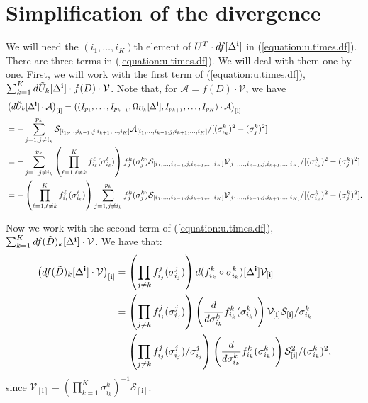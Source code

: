 \section{Simplification of the divergence}
\label{sec:simp.div}
We will need the $(i_1,\ldots,i_K)$th element of $U^T \cdot
df[\Delta^{\bf i}]$ in (\ref{equation:u.times.df}). There are three
terms in (\ref{equation:u.times.df}). We will deal with them one by
one. First, we will work with the first term of
(\ref{equation:u.times.df}), $\sum_{k=1}^Kd\tilde{U}_k[\Delta^{\bf i}]
\cdot f(D) \cdot \mathcal{V}$.  Note that, for $\mathcal{A} =
f(D)\cdot\mathcal{V}$, we have
\begin{align*}
  &\left(d\tilde{U}_k[\Delta^{\bf i}] \cdot \mathcal{A}\right)_{[\mathbf{i}]} = \left((I_{p_1},\ldots,I_{p_{k-1}},\Omega_{U_k}[\Delta^{\bf i}],I_{p_{k+1}},\ldots,I_{p_K})\cdot \mathcal{A}\right)_{[\mathbf{i}]}\\
  &= -\sum_{j=1, j\neq i_k}^{p_k}\mathcal{S}_{[i_1,\ldots,i_{k-1},j,i_{k+1},\ldots,i_K]}\mathcal{A}_{[i_1,\ldots,i_{k-1},j,i_{k+1},\ldots,i_K]}/[(\sigma_{i_k}^k)^2 - (\sigma_j^k)^2]\\
  &= -\sum_{j=1, j\neq i_k}^{p_k}\left(\prod_{\ell=1,\ell \neq k}^Kf_{i_{\ell}}^{\ell}(\sigma_{i_{\ell}}^{\ell})\right)f_j^k(\sigma_j^k)\mathcal{S}_{[i_1,\ldots,i_{k-1},j,i_{k+1},\ldots,i_K]}\mathcal{V}_{[i_1,\ldots,i_{k-1},j,i_{k+1},\ldots,i_K]}/[(\sigma_{i_k}^k)^2 - (\sigma_j^k)^2]\\
  &= -\left(\prod_{\ell=1,\ell \neq k}^Kf_{i_{\ell}}^{\ell}(\sigma_{i_{\ell}}^{\ell})\right)\sum_{j=1, j\neq i_k}^{p_k}f_j^k(\sigma_j^k)\mathcal{S}_{[i_1,\ldots,i_{k-1},j,i_{k+1},\ldots,i_K]}\mathcal{V}_{[i_1,\ldots,i_{k-1},j,i_{k+1},\ldots,i_K]}/[(\sigma_{i_k}^k)^2 - (\sigma_j^k)^2].
\end{align*}

Now we work with the second term of (\ref{equation:u.times.df}),
$\sum_{k=1}^K df(\tilde{D})_k[\Delta^{\bf i}] \cdot \mathcal{V}$.  We
have that:
\begin{align}
  \left(df(\tilde{D})_k[\Delta^{\bf i}] \cdot
    \mathcal{V}\right)_{[\mathbf{i}]} &= \left(\prod_{j\neq
      k}f_{i_j}^j(\sigma_{i_j}^j)\right)d(f_{i_k}^k \circ
  \sigma_{i_k}^k)[\Delta^{\bf i}]\mathcal{V}_{[\mathbf{i}]} \label{equation:simp.diff.first}\\
  &= \left(\prod_{j\neq k}f_{i_j}^j(\sigma_{i_j}^j)\right)\left(\frac{d}{d\sigma_{i_k}^k}f_{i_k}^k(\sigma_{i_k}^k)\right)\mathcal{V}_{[\mathbf{i}]}\mathcal{S}_{[\mathbf{i}]}/\sigma_{i_k}^k\nonumber\\
  &= \left(\prod_{j\neq k}f_{i_j}^j(\sigma_{i_j}^j)/\sigma_{i_j}^j\right)\left(\frac{d}{d\sigma_{i_k}^k}f_{i_k}^k(\sigma_{i_k}^k)\right)\mathcal{S}_{[\mathbf{i}]}^2/(\sigma_{i_k}^k)^2, \label{equation:final.form.second.term}
\end{align}
since $\mathcal{V}_{[\mathbf{i}]} =
\left(\prod_{k=1}^K\sigma_{i_k}^k\right)^{-1}\mathcal{S}_{[\mathbf{i}]}$.

